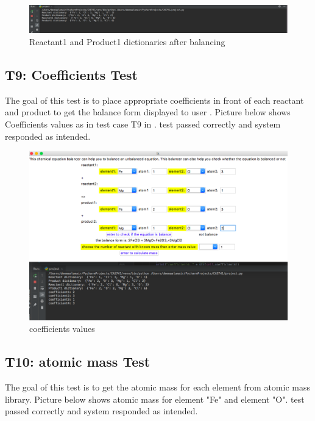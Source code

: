 \documentclass[12pt, titlepage]{article}
\begin{document}
\begin{figure}[H]
 \begin{center}
 \includegraphics [width=\textwidth]{afterbalancing}
 \caption{\label{ Figure 15:} Reactant1 and Product1 dictionaries after balancing}
 \end{center}
 \end{figure}
 
 \subsection{T9: Coefficients Test}

The goal of this test is to place appropriate coefficients in front of each reactant and product to get the balance form displayed to user . Picture below shows Coefficients values as in test case T9 in \cite{UnitVnVPlan}. test passed correctly and system responded as intended.

\begin{figure}[H]
 \begin{center}
 \includegraphics [width=\textwidth]{coff}
 \caption{\label{ Figure 16:} coefficients values}
 \end{center}
 \end{figure}
 
 \subsection{T10: atomic mass Test}

The goal of this test is to get the atomic mass for each element from atomic mass library. Picture below shows atomic mass for element "Fe" and element "O".  test passed correctly and system responded as intended.
\end{document}
